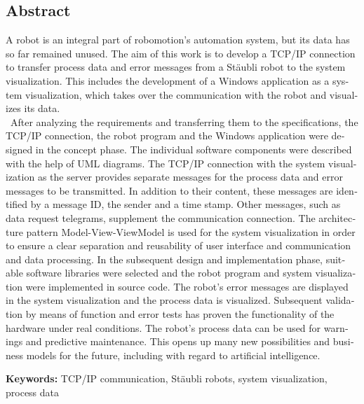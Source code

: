 \begin{otherlanguage}{english}
\chapter*{Abstract}

A robot is an integral part of robomotion's automation system, but its data has so far remained unused. The aim of this work is to develop a TCP/IP connection to transfer process data and error messages from a Stäubli robot to the system visualization. This includes the development of a Windows application as a system visualization, which takes over the communication with the robot and visualizes its data.\\\
After analyzing the requirements and transferring them to the specifications, the TCP/IP connection, the robot program and the Windows application were designed in the concept phase. The individual software components were described with the help of UML diagrams. The TCP/IP connection with the system visualization as the server provides separate messages for the process data and error messages to be transmitted. In addition to their content, these messages are identified by a message ID, the sender and a time stamp. Other messages, such as data request telegrams, supplement the communication connection. The architecture pattern Model-View-ViewModel is used for the system visualization in order to ensure a clear separation and reusability of user interface and communication and data processing. In the subsequent design and implementation phase, suitable software libraries were selected and the robot program and system visualization were implemented in source code. The robot's error messages are displayed in the system visualization and the process data is visualized. Subsequent validation by means of function and error tests has proven the functionality of the hardware under real conditions. The robot's process data can be used for warnings and predictive maintenance. This opens up many new possibilities and business models for the future, including with regard to artificial intelligence.

\vfill
\noindent\textbf{Keywords:} TCP/IP communication, Stäubli robots, system visualization, process data
\vfill
\end{otherlanguage}

